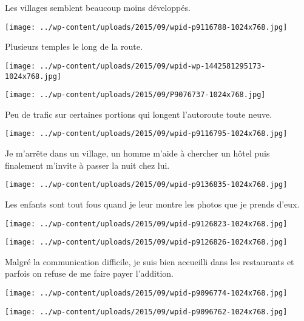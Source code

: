  Les villages semblent beaucoup moins développés.
\begin{center} \texttt{[image: ../wp-content/uploads/2015/09/wpid-p9116788-1024x768.jpg]} \end{center}

\pagebreak
 Plusieurs temples le long de la route.
\begin{center} \texttt{[image: ../wp-content/uploads/2015/09/wpid-wp-1442581295173-1024x768.jpg]} \end{center}
\begin{center} \texttt{[image: ../wp-content/uploads/2015/09/P9076737-1024x768.jpg]} \end{center}

\pagebreak
 Peu de trafic sur certaines portions qui longent l'autoroute toute neuve.
\begin{center} \texttt{[image: ../wp-content/uploads/2015/09/wpid-p9116795-1024x768.jpg]} \end{center}

 Je m'arrête dans un village, un homme m'aide à chercher un hôtel puis finalement m'invite à passer la nuit chez lui.
\begin{center} \texttt{[image: ../wp-content/uploads/2015/09/wpid-p9136835-1024x768.jpg]} \end{center}

\pagebreak
 Les enfants sont tout fous quand je leur montre les photos que je prends d'eux.
\begin{center} \texttt{[image: ../wp-content/uploads/2015/09/wpid-p9126823-1024x768.jpg]} \end{center}
\begin{center} \texttt{[image: ../wp-content/uploads/2015/09/wpid-p9126826-1024x768.jpg]} \end{center}

\pagebreak
 Malgré la communication difficile, je suis bien accueilli dans les restaurants et parfois on refuse de me faire payer l'addition. 
\begin{center} \texttt{[image: ../wp-content/uploads/2015/09/wpid-p9096774-1024x768.jpg]} \end{center}
\begin{center} \texttt{[image: ../wp-content/uploads/2015/09/wpid-p9096762-1024x768.jpg]} \end{center}

